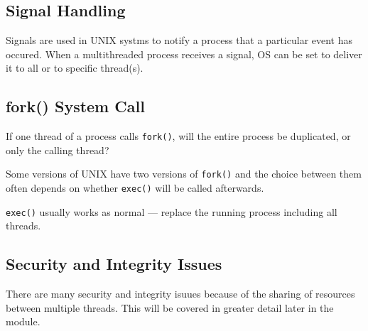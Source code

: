 \documentclass{article}
\begin{document}
\subsection{Signal Handling}
Signals are used in UNIX systms to notify a process that a particular event has occured.
When a multithreaded process receives a signal, OS can be set to deliver it to all or to specific thread(s).

\subsection{fork() System Call}
If one thread of a process calls {\tt fork()}, will the entire process be duplicated, or only the calling thread?

Some versions of UNIX have two versions of {\tt fork()} and the choice between them often depends on whether {\tt exec()} will be called afterwards.

{\tt exec()} usually works as normal --- replace the running process including all threads.

\subsection{Security and Integrity Issues}
There are many security and integrity isuues because of the sharing of resources between multiple threads.
This will be covered in greater detail later in the module.
\end{document}
